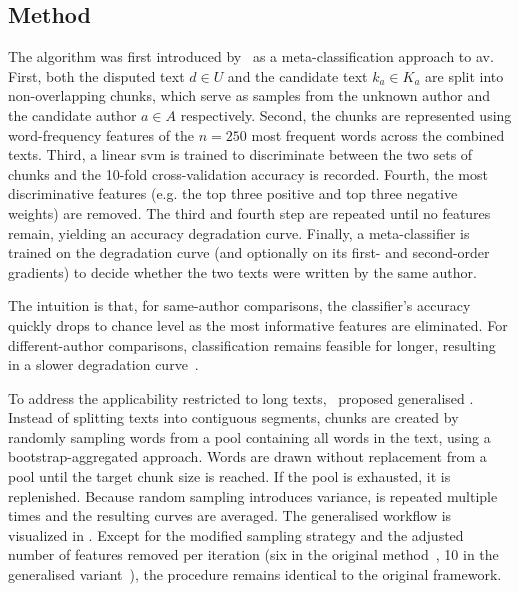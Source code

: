 \subsection{\unmasking{} Method}
\label{subsec:unmasking}

The \unmasking{} algorithm was first introduced by \citet{koppel_authorship_2004}\ as a meta-classification approach to \ac{av}. 
First, both the disputed text $d \in U$ and the candidate text $k_a \in K_a$ are split into non-overlapping chunks, which serve as samples from the unknown author and the candidate author $a \in A$ respectively. 
Second, the chunks are represented using word-frequency features of the $n=250$ most frequent words across the combined texts.
Third, a linear \ac{svm} is trained to discriminate between the two sets of chunks and the 10-fold cross-validation accuracy is recorded.
Fourth, the most discriminative features (e.g. the top three positive and top three negative weights) are removed.  
The third and fourth step are repeated until no features remain, yielding an accuracy degradation curve.  
Finally, a meta-classifier is trained on the degradation curve (and optionally on its first- and second-order gradients) to decide whether the two texts were written by the same author.  

The intuition is that, for same-author comparisons, the classifier’s accuracy quickly drops to chance level as the most informative features are eliminated. 
For different-author comparisons, classification remains feasible for longer, resulting in a slower degradation curve~\citep{stein_intrinsic_2011,tyo_state_2022,bevendorff_divergence_based_2020,stamatatos_survey_2009}. 

To address the applicability restricted to long texts, \citet{bevendorff_generalizing_2019,bevendorff_divergence_based_2020}\ proposed generalised \unmasking{}. 
Instead of splitting texts into contiguous segments, chunks are created by randomly sampling words from a pool containing all words in the text, using a bootstrap-aggregated approach.
Words are drawn without replacement from a pool until the target chunk size is reached.
If the pool is exhausted, it is replenished. 
Because random sampling introduces variance, \unmasking{} is repeated multiple times and the resulting curves are averaged. 
The generalised \unmasking{} workflow is visualized in . 
Except for the modified sampling strategy and the adjusted number of features removed per iteration (six in the original method~\citep{koppel_authorship_2004}, 10 in the generalised variant~\citep{bevendorff_generalizing_2019}), the procedure remains identical to the original \unmasking{} framework.

